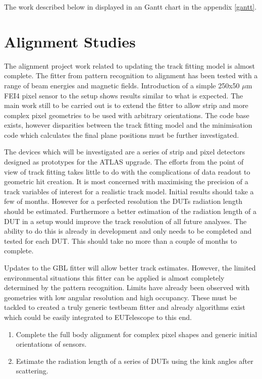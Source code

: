 The work described below in displayed in an Gantt chart in the appendix \ref{gantt}. 

\section{Alignment Studies}
The alignment project work related to updating the track fitting model is almost complete. The fitter from pattern recognition to alignment has been tested with a range of beam energies and magnetic fields. Introduction of a simple 250x50 $\mu$m FEI4 pixel sensor to the setup shows results similar to what is expected. The main work still to be carried out is to extend the fitter to allow strip and more complex pixel geometries to be used with arbitrary orientations. The code base exists, however disparities between the track fitting model and the minimisation code which calculates the final plane positions must be further investigated.

The devices which will be investigated are a series of strip and pixel detectors designed as prototypes for the ATLAS upgrade. The efforts from the point of view of track fitting takes little to do with the complications of data readout to geometric hit creation. It is most concerned with maximising the precision of a track variables of interest for a realistic track model. Initial results should take a few of months. However for a perfected resolution the DUTs radiation length should be estimated. Furthermore  a better estimation of the radiation length of a DUT in a setup would improve the track resolution of all future analyses. The ability to do this is already in development and only needs to be completed and tested for each DUT. This should take no more than a couple of months to complete. 

Updates to the GBL fitter will allow better track estimates. However, the limited environmental situations this fitter can be applied is almost completely determined by the pattern recognition. Limits have already been observed with geometries with low angular resolution and high occupancy. These must be tackled to created a truly generic testbeam fitter and already algorithms exist which could be easily integrated to EUTelescope to this end. 

\begin{enumerate}

  \item Complete the full body alignment for complex pixel shapes and generic initial orientations of sensors.
  \item Estimate the radiation length of a series of DUTs using the kink angles after scattering. 

\end{enumerate}

